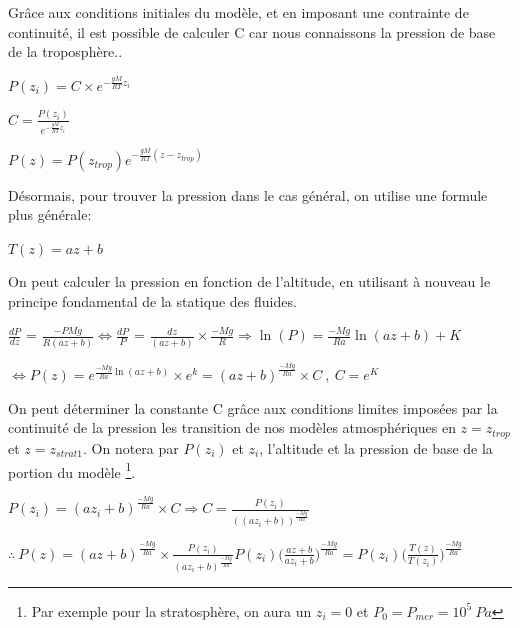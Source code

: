 \documentclass[a4paper, 12pt]{report} %
\begin{document}
Grâce aux conditions initiales du modèle, et en imposant une contrainte de continuité, il est possible de calculer C car nous connaissons la pression de base de la troposphère..

\begin{center}
     $P(z_i)  = C\times e^{-\frac{gM}{RT} z_i }$
\end{center}

\begin{center}
     $C = \frac{P(z_i)}{e^{-\frac{gM}{RT} z_i}}$
\end{center}

\begin{center}
     ${P(z)} = {P(z_{trop})}{e^{-\frac{gM}{RT} (z - z_{trop})}}$
\end{center}

    Désormais, pour trouver la pression dans le cas général, on
utilise une formule plus générale:
\begin{center}
$T(z)=az+b$
\end{center}

On peut calculer la pression en fonction de l'altitude, en utilisant à nouveau le principe fondamental de la statique des fluides.
\begin{center}
     $\frac{dP}{dz}$ = $\frac{-{P} Mg}{R(az+b)}
     \Leftrightarrow \frac{dP}{P}$ = $\frac{dz}{(az+b)} \times \frac{- Mg}{R}
     \Rightarrow \ln(P)=\frac{-Mg}{Ra} \ln(az+b)+K$
\end{center}

\begin{center}
     $\Leftrightarrow P(z) = e^{\frac{-Mg}{Ra}\ln(az+b)} \times e^k =(az+b)^{\frac{-Mg}{Ra}} \times C \ , \ C = e^{K}$
\end{center}

On peut déterminer la constante C grâce aux conditions limites imposées par la continuité de la pression les transition de nos modèles atmosphériques en $z = z_{trop}$ et $z = z_{strat1}$. On notera par $P(z_i)$ et $z_i$, l'altitude et la pression de base de la portion du modèle \footnote{Par exemple pour la stratosphère, on aura un $z_i = 0$ et $P_0 = P_{mer} = 10^5 \ Pa$}.

\begin{center}
$P(z_i) = (a{z_i}+b)^{\frac{-Mg}{Ra}} \times C
\Rightarrow C= \frac{P(z_i)}{((a{z_i}+b))^{\frac{-Mg}{Ra}}}$
\end{center}

\begin{center}
$\therefore \ P(z) = (az+b)^{\frac{-Mg}{Ra}} \times \frac{P(z_i)}{(a{z_i}+b)^{\frac{-Mg}{Ra}}} {P(z_i)} \bigl(\frac{az+b}{a{z_i}+b}\bigr) ^ {\frac{-Mg}{Ra}} = {P(z_i)} \bigl(\frac{T(z)}{T(z_i)}\bigr) ^ {\frac{-Mg}{Ra}}$
\end{center}
\vspace{\baselineskip}
\end{document}
